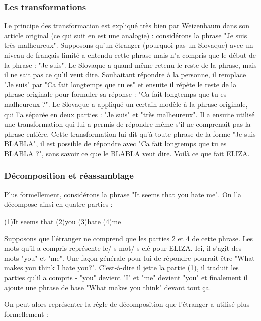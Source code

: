 \documentclass[11pt, a4paper]{report}
\begin{document}
      \subsubsection{Les transformations}
Le principe des transformation est expliqué très bien par Weizenbaum dans son article original (ce qui suit 
en est une analogie) : 
considérons la phrase "Je suis très malheureux". Supposons qu'un étranger (pourquoi pas un Slovaque) avec un niveau de 
français limité a entendu cette phrase mais n'a compris que le début de la phrase : "Je suis". 
Le Slovaque a quand-même retenu le reste de la phrase, mais il ne sait pas ce qu'il veut dire. 
Souhaitant répondre à la personne, il remplace "Je suis" par "Ca fait longtemps que tu es"
et ensuite il répète le reste de la phrase originale pour formuler sa réponse :
"Ca fait longtemps que tu es malheureux ?". Le Slovaque a appliqué un certain modèle
à la phrase originale, qui l'a séparée en deux parties : "Je suis" et "très malheureux".
Il a ensuite utilisé une transformation qui lui a permis de répondre même s'il ne comprenait pas 
la phrase entière. Cette transformation lui dit qu'à toute phrase de la forme 
"Je suis BLABLA", il est possible de répondre avec "Ca fait longtemps que tu es BLABLA ?", 
sans savoir ce que le BLABLA veut dire. Voilà ce que fait ELIZA.  

      \subsubsection{Décomposition et réassamblage}
Plus formellement, considérons la phrase "It seems that you hate me". On l'a décompose ainsi
en quatre parties :

  \begin{center}
    (1)It seems that (2)you (3)hate (4)me
  \end{center} 
  
  Supposons que l'étranger ne comprend que les parties 2 et 4 de cette phrase. Les mots qu'il a compris 
  représente le/-s mot/-s clé pour ELIZA. Ici, il s'agit des mots "you" et "me". Une façon générale 
  pour lui de répondre pourrait être "What makes you think I hate you?". C'est-à-dire il jette la partie (1), 
  il traduit les parties qu'il a compris - "you" devient "I" et "me" devient "you" et finalement il 
  ajoute une phrase de base "What makes you think" devant tout ça. 

  On peut alors représenter la régle de décomposition que l'étranger a utilisé plus formellement :
\end{document}
